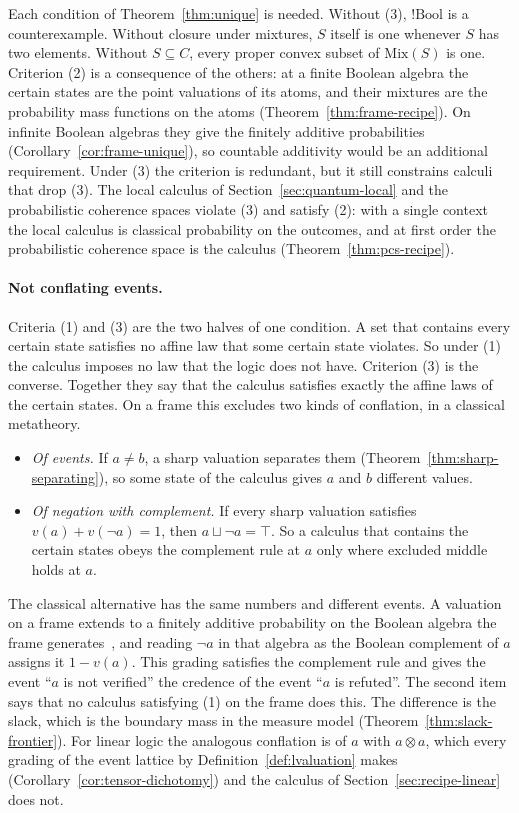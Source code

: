 Each condition of Theorem~\ref{thm:unique} is needed. Without (3),
$!\mathrm{Bool}$ is a counterexample. Without closure under mixtures,
$S$ itself is one whenever $S$ has two elements. Without $S \subseteq C$,
every proper convex subset of $\mathrm{Mix}(S)$ is one. Criterion (2) is a
consequence of the others: at a finite Boolean algebra the certain states
are the point valuations of its atoms, and their mixtures are the
probability mass functions on the atoms (Theorem~\ref{thm:frame-recipe}).
On infinite Boolean algebras they give the finitely additive
probabilities (Corollary~\ref{cor:frame-unique}), so countable additivity
would be an additional requirement. Under (3) the criterion is redundant,
but it still constrains calculi that drop (3). The local calculus of
Section~\ref{sec:quantum-local} and the probabilistic coherence spaces
violate (3) and satisfy (2): with a single context the local calculus is
classical probability on the outcomes, and at first order the
probabilistic coherence space is the calculus (Theorem~\ref{thm:pcs-recipe}).

\paragraph{Not conflating events.}
Criteria (1) and (3) are the two halves of one condition. A set that
contains every certain state satisfies no affine law that some certain
state violates. So under (1) the calculus imposes no law that the logic
does not have. Criterion (3) is the converse. Together they say that the
calculus satisfies exactly the affine laws of the certain
states. On a frame this excludes two kinds of
conflation, in a classical metatheory.
\begin{itemize}
  \item \emph{Of events.} If $a \ne b$, a sharp valuation separates them
  (Theorem~\ref{thm:sharp-separating}), so some state of the calculus
  gives $a$ and $b$ different values.
  \item \emph{Of negation with complement.} If every sharp valuation
  satisfies $v(a) + v(\neg a) = 1$, then $a \sqcup \neg a =
  \top$. So a calculus that contains the
  certain states obeys the complement rule at $a$ only where excluded
  middle holds at $a$.
\end{itemize}
The classical alternative has the same numbers and different events. A
valuation on a frame extends to a finitely additive probability on the
Boolean algebra the frame generates~\cite{pettis1951}, and reading $\neg
a$ in that algebra as the Boolean complement of $a$ assigns it $1 - v(a)$.
This grading satisfies the complement rule and gives the event ``$a$ is
not verified'' the credence of the event ``$a$ is refuted''. The second
item says that no calculus satisfying (1) on the frame does this. The
difference is the slack, which is the boundary mass in the measure model
(Theorem~\ref{thm:slack-frontier}). For linear logic the analogous
conflation is of $a$ with $a \otimes a$, which every grading of the event
lattice by Definition~\ref{def:lvaluation} makes
(Corollary~\ref{cor:tensor-dichotomy}) and the calculus of
Section~\ref{sec:recipe-linear} does not.

